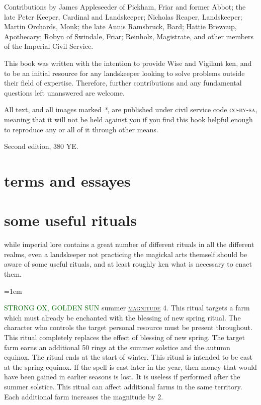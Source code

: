 \documentclass[twoside,11pt,b5paper]{scrbook}
\newcommand{\keyword}[1]{%
  \textcolor{darkgreen}{\expandafter\MakeUppercase{#1}}%
}
\newcommand{\moreindentpar}{\par\hangindent=1em\setlength{\parindent}{2em}}
\newcommand{\noop}{}
\let\endarticle\noop
\renewcommand{\paragraph}[1]{%
  \endarticle%
  \par\hangindent=1em\noindent%
  \let\localpar\moreindentpar
  \markboth{#1}{#1}%
  {\keyword{#1}}\label{#1}%
  \renewcommand{\endarticle}{}
}
\newcommand{\s}[1]{{\textsc{\textcolor{marron}{\hyperref[#1]{#1}}}}}
\begin{document}
\begin{uppertitleback}{}
Contributions by James Appleseeder of Pickham, Friar and former Abbot; the late Peter Keeper, Cardinal and Lands\-keeper; Nicholas Reaper, Lands\-keeper; Martin Orchards, Monk; the late Annis Ramsbruck, Bard; Hattie Brewcup, Apothecary; Robyn of Swindale, Friar; Reinholz, Magistrate, and other members of the Imperial Civil Service.

This book was written with the intention to provide Wise and Vigilant ken, and to be an initial resource for any landskeeper looking to solve problems outside their field of expertise. Therefore, further contributions and any fundamental questions left unanswered are welcome.

All text, and all images marked \textit{*}, are published under civil service code \textsc{cc-by-sa}, meaning that it will not be held against you if you find this book helpful enough to reproduce any or all of it through other means. 

Second edition, 380 YE.
\end{uppertitleback}
\setlength{\parindent}{1em}

\listoftables

\chapter{terms and essayes}
\begin{multicols}{2}

\end{multicols}

\chapter{some useful rituals}
\label{appendix}
while imperial lore contains a great number of different rituals in all the different realms, even a landskeeper not practicing the magickal arts themself should be aware of some useful rituals, and at least roughly ken what is necessary to enact them.
\paragraph{strong ox, golden sun} summer \s{magnitude} 4. This ritual targets a farm which must already be enchanted with the blessing of new spring ritual. The character who controls the target personal resource must be present throughout. This ritual completely replaces the effect of blessing of new spring. The target farm earns an additional 50 rings at the summer solstice and the autumn equinox. The ritual ends at the start of winter. This ritual is intended to be cast at the spring equinox. If the spell is cast later in the year, then money that would have been gained in earlier seasons is lost. It is useless if performed after the summer solstice. This ritual can affect additional farms in the same territory. Each additional farm increases the magnitude by 2.
\end{document}
